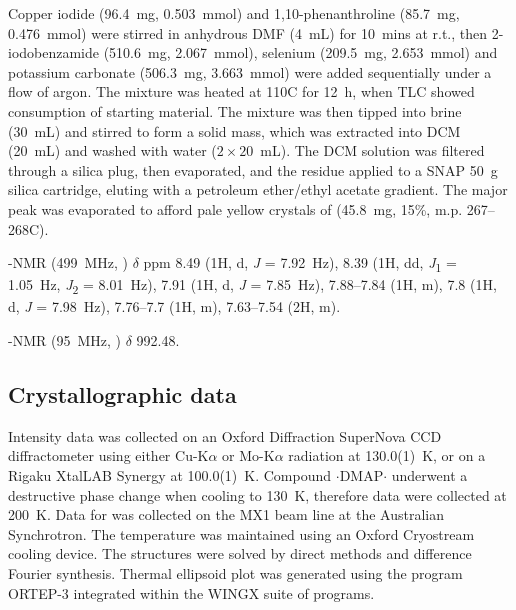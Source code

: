 \begin{refsection}
    Copper iodide (96.4~mg, 0.503~mmol) and 1,10-phenanthroline (85.7~mg, 0.476~mmol) were stirred in anhydrous DMF (4~mL) for 10~mins at r.t., then 2-iodobenzamide (510.6~mg, 2.067~mmol), selenium (209.5~mg, 2.653~mmol) and potassium carbonate (506.3~mg, 3.663~mmol) were added sequentially under a flow of argon.
    The mixture was heated at 110\degree{}C for 12~h, when TLC showed consumption of starting material.
    The mixture was then tipped into brine (30~mL) and stirred to form a solid mass, which was extracted into DCM (20~mL) and washed with water ($ 2 \times 20 $~mL).
    The DCM solution was filtered through a silica plug, then evaporated, and the residue applied to a SNAP 50~g silica cartridge, eluting with a petroleum ether/ethyl acetate gradient.
    The major peak was evaporated to afford pale yellow crystals of  (45.8~mg, 15\%, m.p. 267--268\degree{}C). 
    
    -NMR (499~MHz, ) $\delta$ ppm 8.49 (1H, d, \textit{J} = 7.92~Hz), 8.39 (1H, dd, \textit{J}\textsubscript{1} = 1.05~Hz, \textit{J}\textsubscript{2} = 8.01~Hz), 7.91 (1H, d, \textit{J} = 7.85~Hz), 7.88--7.84 (1H, m), 7.8 (1H, d, \textit{J} = 7.98~Hz), 7.76--7.7 (1H, m), 7.63--7.54 (2H, m).
    
    -NMR (95~MHz, ) $ \delta $ 992.48.
    
    \subsection{Crystallographic data}\label{sec:ch3-si}
    Intensity data was collected on an Oxford Diffraction SuperNova CCD diffractometer using either Cu-K$\alpha$ or Mo-K$\alpha$ radiation at 130.0(1)~K, or on a Rigaku XtalLAB Synergy at 100.0(1)~K. Compound $ \cdot $DMAP$ \cdot $ underwent a destructive phase change when cooling to 130~K, therefore data were collected at 200~K. Data for  was collected on the MX1 beam line at the Australian Synchrotron\autocite{Cowieson2015}. The temperature was maintained using an Oxford Cryostream cooling device. The structures were solved by direct methods and difference Fourier synthesis.\autocite{Sheldrick2015} Thermal ellipsoid plot was generated using the program ORTEP-3\autocite{Farrugia1997} integrated within the WINGX\autocite{Farrugia1999} suite of programs.
    

\end{refsection}
